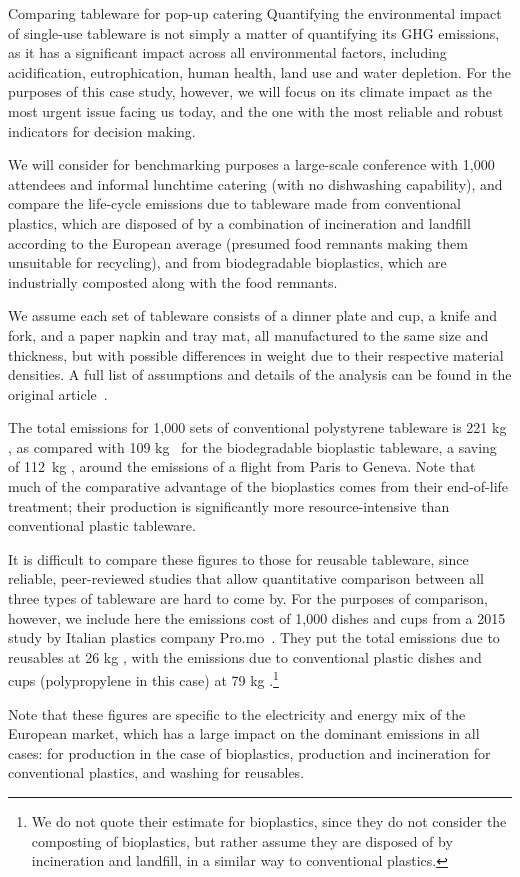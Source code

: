 \documentclass[../SustainableHEP.tex]{subfiles}
\begin{document}
\begin{casestudy}{Comparing tableware for pop-up catering}%
    Quantifying the environmental impact of single-use tableware is not simply a matter of quantifying its GHG emissions, as it has a significant impact across all environmental factors, including acidification, eutrophication, human health, land use and water depletion.  For the purposes of this case study, however, we will focus on its climate impact as the most urgent issue facing us today, and the one with the most reliable and robust indicators for decision making.

    We will consider for benchmarking purposes a large-scale conference with 1,000 attendees and informal lunchtime catering (\ie with no dishwashing capability), and compare the life-cycle emissions due to tableware made from conventional plastics, which are disposed of by a combination of incineration and landfill according to the European average (presumed food remnants making them unsuitable for recycling), and from biodegradable bioplastics, which are industrially composted along with the food remnants.

    We assume each set of tableware consists of a dinner plate and cup, a knife and fork, and a paper napkin and tray mat, all manufactured to the same size and thickness, but with possible differences in weight due to their respective material densities.  A full list of assumptions and details of the analysis can be found in the original article~\cite{Fieschi2018}.   

    The total emissions for 1,000 sets of conventional polystyrene tableware is 221 kg \CdOe, as compared with 109 kg \CdOe\ for the biodegradable bioplastic tableware, a saving of 112~kg \CdOe, around the emissions of a flight from Paris to Geneva.  Note that much of the comparative advantage of the bioplastics comes from their end-of-life treatment; their production is significantly more resource-intensive than conventional plastic tableware.  

    It is difficult to compare these figures to those for reusable tableware, since reliable, peer-reviewed studies that allow quantitative comparison between all three types of tableware are hard to come by.  For the purposes of comparison, however, we include here the emissions cost of 1,000 dishes and cups from a 2015 study by Italian plastics company Pro.mo~\cite{PROMO2015}.  They put the total emissions due to reusables at 26 kg \CdOe, with the emissions due to conventional plastic dishes and cups (polypropylene in this case) at 79 kg \CdOe.\footnote{We do not quote their estimate for bioplastics, since they do not consider the composting of bioplastics, but rather assume they are disposed of by incineration and landfill, in a similar way to conventional plastics.}

    Note that these figures are specific to the electricity and energy mix of the European market, which has a large impact on the dominant emissions in all cases: for production in the case of bioplastics, production and incineration for conventional plastics, and washing for reusables. 

\end{casestudy}
\end{document}
